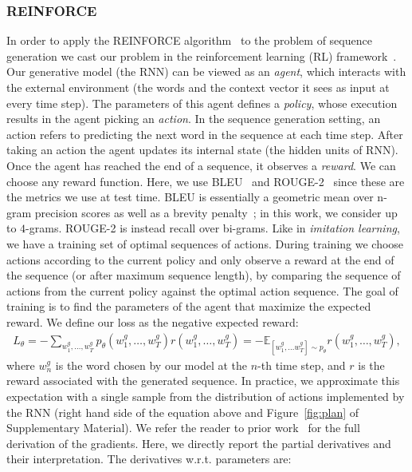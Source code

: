 \documentclass{article} \usepackage{iclr2016_conference,times}
\begin{document}
\subsubsection{REINFORCE} \label{model-reinforce}
In order to apply the REINFORCE algorithm~\citep{reinforce, zaremba-arxiv2015} to the problem of sequence generation we cast our problem in the reinforcement learning (RL) framework~\citep{sutton-rl}. Our generative model (the RNN) can be viewed as an {\em agent}, which interacts with the external environment (the words and the context vector it sees as input at every time step). The parameters of this agent defines a {\em policy}, whose execution results in the agent picking an {\em action}. In the sequence generation setting, an action refers to predicting the next word in the sequence at each time step. 
After taking an action the agent updates its internal state (the hidden units of RNN). Once the agent has reached the end of a sequence, it observes a {\em reward}. We can choose any reward function. Here, we use BLEU~\citep{bleu} and ROUGE-2~\citep{rouge} since these are the metrics we use at test time. BLEU is essentially a geometric mean over n-gram precision scores  as well as a brevity penalty~\citep{liang2006}; in this work, we consider up to $4$-grams. ROUGE-2 is instead recall over bi-grams. 
Like in {\em imitation learning}, we have a training set of optimal sequences of actions. 
During training we choose actions according to the current policy and only observe a reward at the end of the sequence (or after maximum sequence length), by comparing the sequence of actions from the current policy against the optimal action sequence.
The goal of training is to find the parameters of the agent that maximize the expected reward.
We define our loss as the negative expected reward:
\begin{align}
L_{\theta} = - \sum_{w^g_1, \dots, w^g_T} p_\theta(w^g_1, \dots,
w^g_T) r(w^g_1, \dots, w^g_T) = -\mathbb{E}_{[w_1^g, \dots w^g_T] \sim p_\theta} r(w^g_1, \dots, w^g_T), \label{eq:reinforce-loss}
\end{align}
where $w^g_n$ is the word chosen by our model at the $n$-th time step, and $r$ is the reward associated with the generated sequence. 
In practice, we approximate this expectation with a single sample
from the distribution of actions implemented by the RNN (right hand side of the equation above and Figure~\ref{fig:plan} of Supplementary Material). 
We refer the reader to prior work~\citep{zaremba-arxiv2015,reinforce} for the full derivation of the gradients. Here, we directly report the partial derivatives and their interpretation. The derivatives w.r.t. parameters are:
\end{document}
